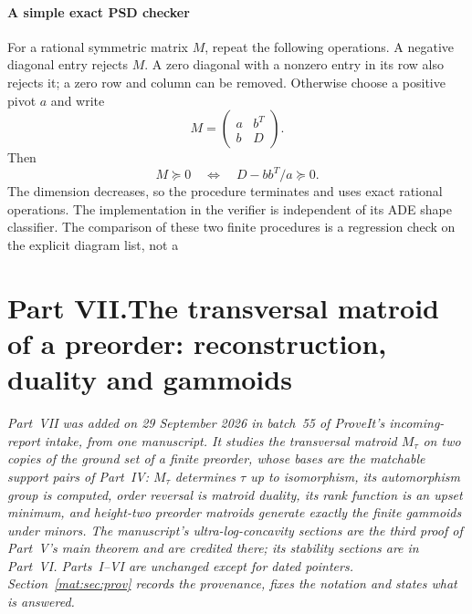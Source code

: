 \documentclass[11pt]{article}
\numberwithin{equation}{section}
\theoremstyle{definition}
\begin{document}
\subsection{A simple exact PSD checker}

For a rational symmetric matrix $M$, repeat the following operations.
A negative diagonal entry rejects $M$.  A zero diagonal with a nonzero
entry in its row also rejects it; a zero row and column can be removed.
Otherwise choose a positive pivot $a$ and write
\[
 M=\begin{pmatrix}a&b^T\\b&D\end{pmatrix}.
\]
Then
\[
 M\succeq0\quad\Longleftrightarrow\quad D-bb^T/a\succeq0.
\]
The dimension decreases, so the procedure terminates and uses exact
rational operations.  The implementation in the verifier is independent
of its ADE shape classifier.  The comparison of these two finite
procedures is a regression check on the explicit diagram list, not a

\clearpage
{}\part*{Part VII.\quad The transversal matroid of a preorder: reconstruction, duality and gammoids}

\noindent\emph{Part~VII was added on 29 September 2026 in batch~55 of
ProveIt's incoming-report intake, from one manuscript. It studies the
transversal matroid $M_\tau$ on two copies of the ground set of a finite
preorder, whose bases are the matchable support pairs of Part~IV: $M_\tau$
determines $\tau$ up to isomorphism, its automorphism group is computed,
order reversal is matroid duality, its rank function is an upset minimum,
and height-two preorder matroids generate exactly the finite gammoids under
minors. The manuscript's ultra-log-concavity sections are the third proof
of Part~V's main theorem and are credited there; its stability sections are
in Part~VI. Parts~I--VI are unchanged except for dated pointers.
Section~\ref{mat:sec:prov} records the provenance, fixes the notation and
states what is answered.}
\end{document}
